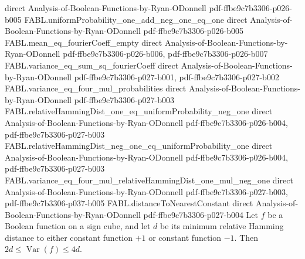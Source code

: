 \begin{theorem}
  {direct}
  {Analysis-of-Boolean-Functions-by-Ryan-ODonnell}
  {pdf-ffbe9c7b3306-p026-b005}
\proofstep
  {FABL.uniformProbability_one_add_neg_one_eq_one}
  {direct}
  {Analysis-of-Boolean-Functions-by-Ryan-ODonnell}
  {pdf-ffbe9c7b3306-p026-b005}
\proofstep
  {FABL.mean_eq_fourierCoeff_empty}
  {direct}
  {Analysis-of-Boolean-Functions-by-Ryan-ODonnell}
  {pdf-ffbe9c7b3306-p026-b006,
    pdf-ffbe9c7b3306-p026-b007}
\proofstep
  {FABL.variance_eq_sum_sq_fourierCoeff}
  {direct}
  {Analysis-of-Boolean-Functions-by-Ryan-ODonnell}
  {pdf-ffbe9c7b3306-p027-b001,
    pdf-ffbe9c7b3306-p027-b002}
\proofstep
  {FABL.variance_eq_four_mul_probabilities}
  {direct}
  {Analysis-of-Boolean-Functions-by-Ryan-ODonnell}
  {pdf-ffbe9c7b3306-p027-b003}
\proofstep
  {FABL.relativeHammingDist_one_eq_uniformProbability_neg_one}
  {direct}
  {Analysis-of-Boolean-Functions-by-Ryan-ODonnell}
  {pdf-ffbe9c7b3306-p026-b004,
    pdf-ffbe9c7b3306-p027-b003}
\proofstep
  {FABL.relativeHammingDist_neg_one_eq_uniformProbability_one}
  {direct}
  {Analysis-of-Boolean-Functions-by-Ryan-ODonnell}
  {pdf-ffbe9c7b3306-p026-b004,
    pdf-ffbe9c7b3306-p027-b003}
\proofstep
  {FABL.variance_eq_four_mul_relativeHammingDist_one_mul_neg_one}
  {direct}
  {Analysis-of-Boolean-Functions-by-Ryan-ODonnell}
  {pdf-ffbe9c7b3306-p027-b003,
    pdf-ffbe9c7b3306-p037-b005}
\proofstep
  {FABL.distanceToNearestConstant}
  {direct}
  {Analysis-of-Boolean-Functions-by-Ryan-ODonnell}
  {pdf-ffbe9c7b3306-p027-b004}
Let $f$ be a Boolean function on a sign cube, and let $d$ be its minimum relative
Hamming distance to either constant function $+1$ or constant function $-1$. Then $2d\le
\operatorname{Var}(f)\le 4d$.
\end{theorem}

